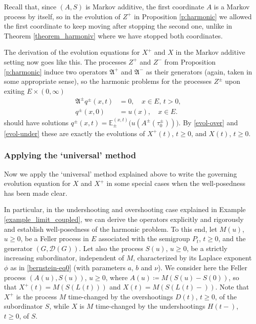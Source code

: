 \documentclass[reqno]{amsart}
\theoremstyle{remark}
\numberwithin{equation}{section} %
\newcommand{\EE}{\mathds{E}}
\newcommand{\DD}{\mathcal{D}}
\newcommand{\1}{\mathds{1}}
\begin{document}
	Recall that, since $(A,S)$ is Markov additive, the first coordinate $A$ is a Markov process by itself, so in the evolution of $Z^+$ in Proposition \ref{p:harmonic} we allowed the first coordinate to keep moving after stopping the second one, unlike in Theorem \ref{theorem_harmoniv} where we have stopped both coordinates.
	
	The derivation of the evolution equations for $X^+$ and $X$ in the Markov additive setting now goes like this. The processes $Z^+$ and $Z^-$ from Proposition \ref{p:harmonic} induce two operators $\mathfrak{A}^+$ and $\mathfrak{A}^-$ as their generators (again, taken in some appropriate sense), so the harmonic problems for the processes $Z^\pm$ upon exiting $E\times (0,\infty)$
	\begin{align}\label{evolutions-NO2}
		\mathfrak{A}^\pm q^\pm(x,t) &= 0, \quad x\in E,\,t>0,\\
		q^\pm(x,0) &= u(x),\quad x\in E.
	\end{align}
	should have solutions $q^\pm(x,t)=\EE^{(x,t)}_\pm\big(u(A^\pm(\tau^\pm_0))\big)$. By \eqref{evol-over} and \eqref{evol-under} these are exactly the evolutions of $X^+(t)$, $t\ge0$, and $X(t)$, $t\ge0$.
	
	
	
	
	\subsubsection*{Applying the `universal' method}
	Now we apply the `universal' method explained above to write the governing evolution equation for $X$ and $X^+$ in some special cases when the well-posedness has been made clear.
	
	In particular, in the undershooting and overshooting case explained in Example \ref{example_limit_coupled}, we can derive the operators explicitly and rigorously and establish well-posedness of the harmonic problem. To this end, let $M(u)$, $u\ge0$, be a Feller process in $E$ associated with the semigroup $P_t$, $t \geq 0$, and the generator $(G,\DD(G))$. Let also the process  $S(u)$, $u\ge 0$, be a strictly increasing subordinator, independent of $M$, characterized by its Laplace exponent $\phi$ as in \eqref{bernstein-eq0} (with parameters $a$, $b$ and $\nu$). We consider here the Feller process $(A(u), S(u))$, $u \geq 0$, where $A(u) \coloneqq M(S(u)-S(0))$, so that $X^+(t) = M(S(L(t)))$ and $X(t) = M(S(L(t)-))$. Note that $X^+$ is the process $M$ time-changed by the overshootings $D(t)$, $t\ge0$, of the subordinator $S$, while $X$ is $M$ time-changed by the undershootings $H(t-)$, $t\ge0$, of $S$.
	
\end{document}
